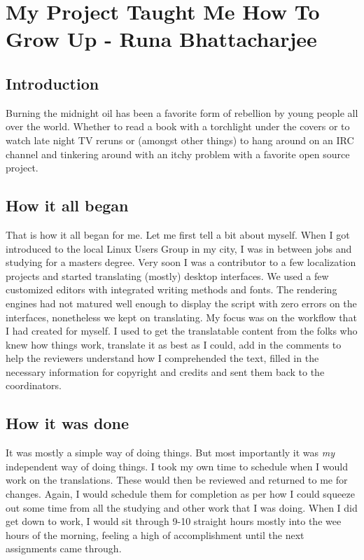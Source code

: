 \chapter{My Project Taught Me How To Grow Up - Runa Bhattacharjee}
\section*{Introduction}

Burning the midnight oil has been a favorite form of rebellion by young people all over the world. Whether to read a book with a torchlight under the covers or to watch late night TV reruns or (amongst other things) to hang around on an IRC channel and tinkering around with an itchy problem with a favorite open source project. 

\section*{How it all began}

That is how it all began for me. Let me first tell a bit about myself. When I got introduced to the local Linux Users Group in my city, I was in between jobs and studying for a masters degree. Very soon I was a contributor to a few localization projects and started translating (mostly) desktop interfaces. We used a few customized editors with integrated writing methods and fonts. The rendering engines had not matured well enough to display the script with zero errors on the interfaces, nonetheless we kept on translating. My focus was on the workflow that I had created for myself. I used to get the translatable content from the folks who knew how things work, translate it as best as I could, add in the comments to help the reviewers understand how I comprehended the text, filled in the necessary information for copyright and credits and sent them back to the coordinators.

\section*{How it was done}

It was mostly a simple way of doing things. But most importantly it was \textit{my} independent way of doing things. I took my own time to schedule when I would work on the translations. These would then be reviewed and returned to me for changes. Again, I would schedule them for completion as per how I could squeeze out some time from all the studying and other work that I was doing. When I did get down to work, I would sit through 9-10 straight hours mostly into the wee hours of the morning, feeling a high of accomplishment until the next assignments came through.

